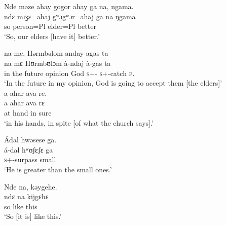\ea Nde  məze  ahay  gogor  ahay  ga  na,  ngama.\\
 \gll ndɛ  mɪʒɛ=ahaj  gʷɔgʷɔr=ahaj ga  na   ŋgama\\
 so    person=Pl  elder=Pl   {\ADJ}   {\PSP}  better\\
\glt  ‘So, our elders [have it] better.’ 
 \z

  na  me,  Hərmbəlom  anday  agas  ta   \\
    na     mɛ        Hʊrmbʊlɔm  à-ndaj       à-gas          ta\\
 {in the future}  {\PSP}  opinion  God           \textsc{s}+{\PFV}-{\PROG}  \textsc{s}+{\PFV}-catch  \textsc{p}.{\DO}  \\
 \glt ‘In the future in my opinion, God is going to accept them [the elders]’\\
 
 \medskip
 a  ahar  ava  re.\\
 \gll a    ahar  ava   rɛ\\
 at   hand  in      sure\\
 \glt ‘in his hands, in spite [of what the church says].’ 
 \z

\ea  Ádal  hwəsese  ga.\\
 \gll á-dal    hʷʊʃɛʃɛ  ga\\
 \textsc{s}+{\IFV}-surpass  small  {\ADJ}\\
 \glt ‘He is greater than the small ones.’
 \z

\ea Nde  na,  kəygehe.\\
 \gll ndɛ    na   kijgɛhɛ\\
 so    {\PSP}  {like this}\\
 \glt ‘So [it is] like this.’
\z
